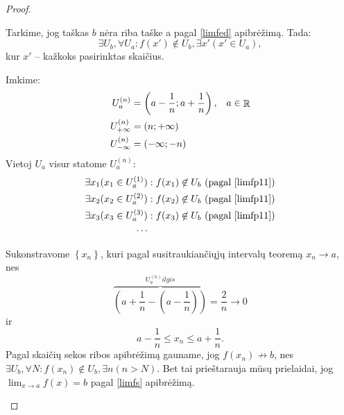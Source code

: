 \begin{prop}
\begin{proof}
\begin{description}
        Tarkime, jog taškas $b$ nėra riba taške a pagal \ref{limfed}
        apibrėžimą. Tada:
        \begin{equation}
          \exists U_{b}, \forall U_{a} :%
            f(x') \not\in U_{b}, \exists x' (x' \in U_{a}),
          \label{limfp11}
        \end{equation}
        kur $x'$ – kažkoks pasirinktas skaičius.

        Imkime:
        \begin{align*}
          U ^{(n)} _{a} &= \left( a - \frac{1}{n}; a + \frac{1}{n} \right),%
            &a \in \RSET \\
          U ^{(n)} _{+\infty} &= (n; +\infty) \\
          U ^{(n)} _{-\infty} &= (-\infty; -n)
        \end{align*}
        Vietoj $U_{a}$ visur statome $U ^{(n)} _{a}$:
        \begin{align*}
          \exists x_{1} (x_{1} \in U _{a} ^{(1)}) &:%
            f(x_{1}) \not\in U_{b}%
            \text{ (pagal \ref{limfp11})} \\
          \exists x_{2} (x_{2} \in U _{a} ^{(2)}) &:%
            f(x_{2}) \not\in U_{b}%
            \text{ (pagal \ref{limfp11})} \\
          \exists x_{3} (x_{3} \in U _{a} ^{(3)}) &:%
            f(x_{3}) \not\in U_{b}%
            \text{ (pagal \ref{limfp11})} \\
          \cdots
        \end{align*}

        Sukonstravome $\left\{ x_{n} \right\}$, kuri pagal susitraukiančiųjų
        intervalų teoremą $x_{n} \to a$, nes
        \[
        \overbrace{\left(a+\frac{1}{n} - \left(a-\frac{1}{n}\right)\right)%
          }^{U ^{(n)} _{a} ilgis} = \frac{2}{n} \to 0
        \]
        ir
        \[
        a - \frac{1}{n} \leq x_{n} \leq a + \frac{1}{n}.
        \]
        Pagal skaičių sekos ribos apibrėžimą gauname, jog 
        $f(x_{n}) \not\to b$, nes $\exists U_{b}, \forall N:%
        f(x_{n}) \not\in U_{b}, \exists n (n > N)$. Bet tai prieštarauja
        mūsų prielaidai, jog $\lim _{x \to a} f(x) = b$ pagal \ref{limfs}
        apibrėžimą.
    \end{description}
  \end{proof}
\end{prop}
